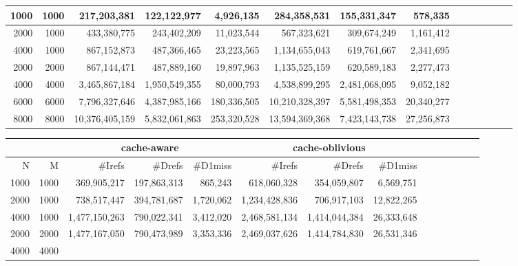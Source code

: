 \documentclass[10pt,a4paper]{article}
\begin{document}
{{\begin{tabular}{|r|r||r|r|r||r|r|r||r|r|r||r|r|r||}
\\ \hline
\hline
1000 & 1000 
& 217,203,381  & 122,122,977  & 4,926,135  %
& 284,358,531 & 155,331,347 & 578,335  %

\\ \hline
2000 & 1000 
& 433,380,775  & 243,402,209 & 11,023,544  %
& 567,323,621 & 309,674,249 & 1,161,412  %

\\ \hline
4000 & 1000 
& 867,152,873 & 487,366,465  & 23,223,565   %
& 1,134,655,043 & 619,761,667  & 2,341,695  %

\\ \hline
2000 & 2000 
& 867,144,471  & 487,889,160  & 19,897,963   %
& 1,135,525,159 & 620,589,183 & 2,277,473  %

\\ \hline
4000 & 4000 
& 3,465,867,184 & 1,950,549,355 & 80,000,793   %
& 4,538,899,295 & 2,481,068,095 & 9,052,182  %

\\ \hline
6000 & 6000 
& 7,796,327,646 & 4,387,985,166 & 180,336,505  %
& 10,210,328,397 & 5,581,498,353 & 20,340,277  %

\\ \hline
8000 & 8000 
& 10,376,405,159 & 5,832,061,863 & 253,320,528  %
& 13,594,369,368 & 7,423,143,738  & 27,256,873  %

\\ \hline
\hline
\end{tabular}
}

\begin{tabular}{|r|r||r|r|r||r|r|r||r|r|r||r|r|r||}
  \hline
   \multicolumn{2}{|c||}{ }
   & \multicolumn{3}{c||}{cache-aware}
& \multicolumn{3}{c||}{cache-oblivious}
\\ \hline
N & M 

& \#Irefs & \#Drefs & \#D1miss %
& \#Irefs & \#Drefs & \#D1miss %
\\ \hline
\hline
1000 & 1000 
& 369,905,217 & 197,863,313 & 865,243  %
& 618,060,328 & 354,059,807 & 6,569,751  %
\\ \hline
2000 & 1000 

& 738,517,447 & 394,781,687 & 1,720,062  %
& 1,234,428,836 & 706,917,103  & 12,822,265   %
\\ \hline
4000 & 1000 
& 1,477,150,263 & 790,022,341  & 3,412,020   %
& 2,468,581,134 & 1,414,044,384 & 26,333,648   %
\\ \hline
2000 & 2000 
& 1,477,167,050 & 790,473,989 & 3,353,336   %
& 2,469,037,626 & 1,414,784,830 & 26,531,346  %
\\ \hline
4000 & 4000 


\end{tabular}}
\end{document}
